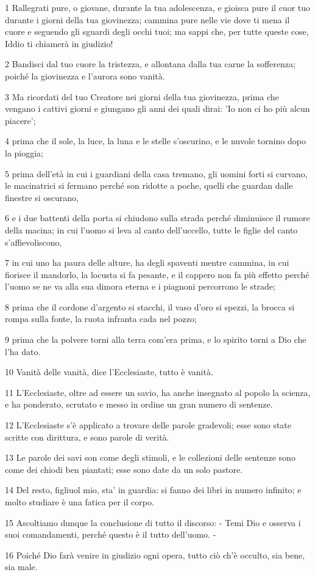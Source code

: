 \par 1 Rallegrati pure, o giovane, durante la tua adolescenza, e gioisca pure il cuor tuo durante i giorni della tua giovinezza; cammina pure nelle vie dove ti mena il cuore e seguendo gli sguardi degli occhi tuoi; ma sappi che, per tutte queste cose, Iddio ti chiamerà in giudizio!
\par 2 Bandisci dal tuo cuore la tristezza, e allontana dalla tua carne la sofferenza; poiché la giovinezza e l'aurora sono vanità.
\par 3 Ma ricordati del tuo Creatore nei giorni della tua giovinezza, prima che vengano i cattivi giorni e giungano gli anni dei quali dirai: 'Io non ci ho più alcun piacere';
\par 4 prima che il sole, la luce, la luna e le stelle s'oscurino, e le nuvole tornino dopo la pioggia;
\par 5 prima dell'età in cui i guardiani della casa tremano, gli uomini forti si curvano, le macinatrici si fermano perché son ridotte a poche, quelli che guardan dalle finestre si oscurano,
\par 6 e i due battenti della porta si chiudono sulla strada perché diminuisce il rumore della macina; in cui l'uomo si leva al canto dell'uccello, tutte le figlie del canto s'affievoliscono,
\par 7 in cui uno ha paura delle alture, ha degli spaventi mentre cammina, in cui fiorisce il mandorlo, la locusta si fa pesante, e il cappero non fa più effetto perché l'uomo se ne va alla sua dimora eterna e i piagnoni percorrono le strade;
\par 8 prima che il cordone d'argento si stacchi, il vaso d'oro si spezzi, la brocca si rompa sulla fonte, la ruota infranta cada nel pozzo;
\par 9 prima che la polvere torni alla terra com'era prima, e lo spirito torni a Dio che l'ha dato.
\par 10 Vanità delle vanità, dice l'Ecclesiaste, tutto è vanità.
\par 11 L'Ecclesiaste, oltre ad essere un savio, ha anche insegnato al popolo la scienza, e ha ponderato, scrutato e messo in ordine un gran numero di sentenze.
\par 12 L'Ecclesiaste s'è applicato a trovare delle parole gradevoli; esse sono state scritte con dirittura, e sono parole di verità.
\par 13 Le parole dei savi son come degli stimoli, e le collezioni delle sentenze sono come dei chiodi ben piantati; esse sono date da un solo pastore.
\par 14 Del resto, figliuol mio, sta' in guardia: si fanno dei libri in numero infinito; e molto studiare è una fatica per il corpo.
\par 15 Ascoltiamo dunque la conclusione di tutto il discorso: - Temi Dio e osserva i suoi comandamenti, perché questo è il tutto dell'uomo. -
\par 16 Poiché Dio farà venire in giudizio ogni opera, tutto ciò ch'è occulto, sia bene, sia male.


